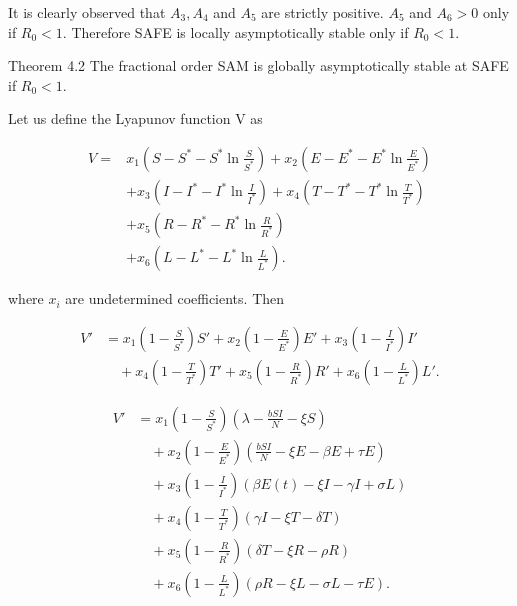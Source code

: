 \documentclass[10pt]{NSP1}
\begin{document}
It is clearly observed that \(A_{3},A_{4}\) and \(A_{5}\) are strictly positive. \(A_{5}\) and \(A_{6} > 0\) only if \(R_{0} < 1\). Therefore SAFE is locally asymptotically stable only if \(R_{0} < 1\).

Theorem 4.2 The fractional order SAM is globally asymptotically stable at SAFE if \(R_{0} < 1\).

Let us define the Lyapunov function V as

\[
\begin{matrix}
V = & x_{1}\left( S - S^{*} - S^{*}\ln\frac{S}{S^{*}} \right) + x_{2}\left( E - E^{*} - E^{*}\ln\frac{E}{E^{*}} \right) \\ & + x_{3}\left( I - I^{*} - I^{*}\ln\frac{I}{I^{*}} \right) + x_{4}\left( T - T^{*} - T^{*}\ln\frac{T}{T^{*}} \right) \\ & + x_{5}\left( R - R^{*} - R^{*}\ln\frac{R}{R^{*}} \right) \\ & + x_{6}\left( L - L^{*} - L^{*}\ln\frac{L}{L^{*}} \right).
\end{matrix}
\]

where \(x_{i}\) are undetermined coefficients. Then

\[
\begin{matrix}
V' & = x_{1}\left( 1 - \frac{S}{S^{*}} \right)S' + x_{2}\left( 1 - \frac{E}{E^{*}} \right)E' + x_{3}\left( 1 - \frac{I}{I^{*}} \right)I' \\ & \quad + x_{4}\left( 1 - \frac{T}{T^{*}} \right)T' + x_{5}\left( 1 - \frac{R}{R^{*}} \right)R' + x_{6}\left( 1 - \frac{L}{L^{*}} \right)L'.
\end{matrix}
\]

\[
\begin{matrix}
V' & = x_{1}\left( 1 - \frac{S}{S^{*}} \right)\left( \lambda - \frac{bSI}{N} - \xi S \right) \\ & \quad + x_{2}\left( 1 - \frac{E}{E^{*}} \right)\left( \frac{bSI}{N} - \xi E - \beta E + \tau E \right) \\ & \quad + x_{3}\left( 1 - \frac{I}{I^{*}} \right)\left( \beta E(t) - \xi I - \gamma I + \sigma L \right) \\ & \quad + x_{4}\left( 1 - \frac{T}{T^{*}} \right)(\gamma I - \xi T - \delta T) \\ & \quad + x_{5}\left( 1 - \frac{R}{R^{*}} \right)(\delta T - \xi R - \rho R) \\ & \quad + x_{6}\left( 1 - \frac{L}{L^{*}} \right)(\rho R - \xi L - \sigma L - \tau E).
\end{matrix}
\]
\end{document}
